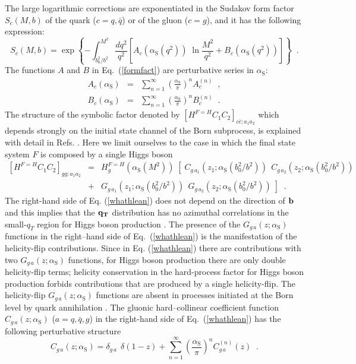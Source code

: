 \documentclass[12pt]{article}
\def\beeq{\begin{eqnarray}}
\def\eeeq{\end{eqnarray}}
\def\nn{\nonumber}
\newcommand\as{\alpha_{\mathrm{S}}}
\def\qt{q_T}
\def\bqt{{\bf q_T}}
\begin{document}
The large logarithmic corrections are exponentiated in the Sudakov form factor $S_c(M,b)$ of the quark  ($c=q, {\bar q}$) or of the gluon ($c=g$), and it has the following  expression:
\begin{equation}
\label{formfact}
S_c(M,b) = \exp \left\{ - \int_{b_0^2/b^2}^{M^2} \frac{dq^2}{q^2} 
\left[ A_c(\as(q^2)) \;\ln \frac{M^2}{q^2} + B_c(\as(q^2)) \right] \right\} 
\;\;. 
\end{equation}
The functions $A$ and $B$  in Eq.~(\ref{formfact}) are perturbative series in $\as$:
\beeq
\label{aexp}
A_c(\as) &=& \sum_{n=1}^\infty \left( \frac{\as}{\pi} \right)^n A_c^{(n)} 
\;\;, \\
\label{bexp}
B_c(\as) &= &\sum_{n=1}^\infty \left( \frac{\as}{\pi} \right)^n B_c^{(n)}
\;\;.
\eeeq
The structure of the symbolic factor denoted by $\left[ H^{F=H} C_1 C_2 \right]_{c\bar{c};a_{1} a_{2}}$ which depends strongly on the initial state channel of the Born subprocess, is explained with detail in Refs. \cite{Catani:2010pd,Catani:2013tia}. Here we limit ourselves to the case in which the final state system $F$ is composed by a single Higgs boson
\beeq
\label{whathlean}
\left[ H^{F=H} C_1 C_2 \right]_{gg;a_{1}a_{2}}
&=& H_{g}^{F=H}(\as(M^2)) \;\left[ \; C_{g \,a_{1}}(z_1;\as(b_0^2/b^2)) 
\;\, C_{g \,a_{2}}(z_2;\as(b_0^2/b^2)) \right.
\nn \\
&+& \left.  G_{g \,a_{1}}(z_1;\as(b_0^2/b^2)) 
\;\, G_{g \,a_{2}}(z_2;\as(b_0^2/b^2)) \;
\right]
\;\;. 
\eeeq 
The right-hand side of Eq. (\ref{whathlean}) does not depend on the direction of $\bf b$ and this implies that the $\bqt$ distribution has no azimuthal correlations in the small-$\qt$ region for Higgs boson production \cite{Catani:2010pd}. The presence of the $G_{g \,a}(z;\as)$ functions in the right--hand side of Eq.~(\ref{whathlean}) is the manifestation of the helicity-flip contributions. Since in Eq. (\ref{whathlean}) there are contributions with two $G_{g \,a}(z;\as)$ functions, for Higgs boson production there are only double helicity-flip terms; helicity conservation in the hard-process factor for Higgs boson production forbids contributions that are produced by a single helicity-flip. The helicity-flip $G_{g \,a}(z;\as)$ functions are absent in processes initiated at the Born level by quark annihilation \cite{Catani:2010pd}. The gluonic hard--collinear coefficient function $C_{g \,a}(z;\as)$ ($a=q,{\bar q},g$) in the right-hand side of Eq.~(\ref{whathlean}) has the following perturbative structure
\begin{equation}
\label{cgexp} 
C_{g \,a}(z;\as) = \delta_{g \,a} \;\,\delta(1-z) + 
\sum_{n=1}^\infty \left( \frac{\as}{\pi} \right)^n C_{g\, a}^{(n)}(z) \;\;.
\end{equation}
\end{document}
